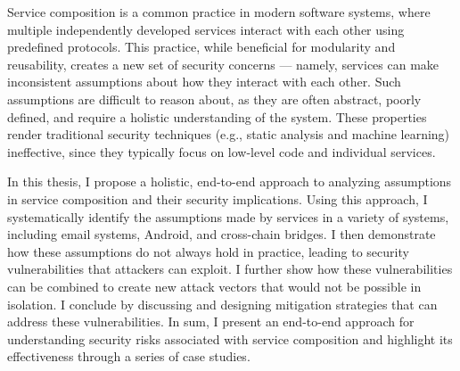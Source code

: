 
\begin{dissertationabstract} 
Service composition is a common practice in modern software systems, where multiple independently developed services interact with each other using predefined protocols. This practice, while beneficial for modularity and reusability, creates a new set of security concerns --- namely, services can make inconsistent assumptions about how they interact with each other. Such assumptions are difficult to reason about, as they are often abstract, poorly defined, and require a holistic understanding of the system. These properties render traditional security techniques (e.g., static analysis and machine learning) ineffective, since they typically focus on low-level code and individual services.

In this thesis, I propose a holistic, end-to-end approach to analyzing assumptions in service composition and their security implications. Using this approach, I systematically identify the assumptions made by services in a variety of systems, including email systems, Android, and cross-chain bridges. I then demonstrate how these assumptions do not always hold in practice, leading to security vulnerabilities that attackers can exploit. I further show how these vulnerabilities can be combined to create new attack vectors that would not be possible in isolation. I conclude by discussing and designing mitigation strategies that can address these vulnerabilities. In sum, I present an end-to-end approach for understanding security risks associated with service composition and highlight its effectiveness through a series of case studies.




\end{dissertationabstract}